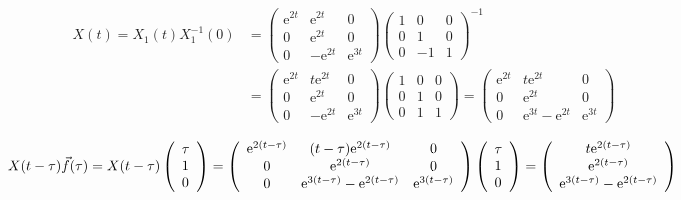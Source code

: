 $$ \begin{aligned}
X(t) =X_{1}(t) X_{1}^{-1}(0) & =  \left(\begin{array}{ccc}
\mathrm{e}^{2 t} & \mathrm{e}^{2 t} & 0 \\
0 & \mathrm{e}^{2 t} & 0 \\
0 & -\mathrm{e}^{2 t} & \mathrm{e}^{3 t}
\end{array}\right)\left(\begin{array}{ccc}
1 & 0 & 0 \\
0 & 1 & 0 \\
0 & -1 & 1
\end{array}\right)^{-1} \\ & =\left(\begin{array}{ccc}
\mathrm{e}^{2 t} & t \mathrm{e}^{2 t} & 0 \\
0 & \mathrm{e}^{2 t} & 0 \\
0 & -\mathrm{e}^{2 t} & \mathrm{e}^{3 t}
\end{array}\right)\left(\begin{array}{lll}
1 & 0 & 0 \\
0 & 1 & 0 \\
0 & 1 & 1
\end{array}\right)=\left(\begin{array}{lcc}
\mathrm{e}^{2 t} & t \mathrm{e}^{2 t} & 0 \\
0 & \mathrm{e}^{2 t} & 0 \\
0 & \mathrm{e}^{3 t}-\mathrm{e}^{2 t} & \mathrm{e}^{3 t}
\end{array}\right) \end{aligned}$$

$$
X(t-\tau) \vec{f}(\tau)=X(t-\tau)\left(\begin{array}{l}
\tau \\
1 \\
0
\end{array}\right)=\left(\begin{array}{ccc}
\mathrm{e}^{2(t-\tau)} & (t-\tau) \mathrm{e}^{2(t-\tau)} & 0 \\
0 & \mathrm{e}^{2(t-\tau)} & 0 \\
0 & \mathrm{e}^{3(t-\tau)}-\mathrm{e}^{2(t-\tau)} & \mathrm{e}^{3(t-\tau)}
\end{array}\right)\left(\begin{array}{l}
\tau \\
1 \\
0
\end{array}\right)=\left(\begin{array}{c}
t \mathrm{e}^{2(t-\tau)} \\
\mathrm{e}^{2(t-\tau)} \\
\mathrm{e}^{3(t-\tau)}-\mathrm{e}^{2(t-\tau)}
\end{array}\right) \\
 $$

